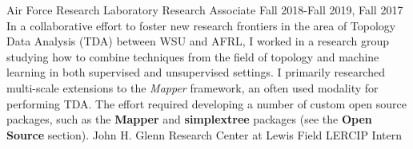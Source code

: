 \documentclass[11pt,a4paper,sans]{moderncv} %
\begin{document}
			 {Air Force Research Laboratory}
			 {Research Associate}
			 {Fall 2018-Fall 2019, Fall 2017}{}{\vspace{3pt}
			 In a collaborative effort to foster new research frontiers in the area of Topology Data Analysis (TDA) between WSU and AFRL, I worked in a research group studying how to combine techniques from  the field of topology and machine learning in both supervised and unsupervised settings. I primarily researched multi-scale extensions to the \textit{Mapper} framework, an often used modality for performing TDA. 
The effort required developing a number of custom open source packages, such as the \textbf{Mapper} and \textbf{simplextree} packages (see the \textbf{Open Source} section).  
}
\vspace{0.75em}
			 {John H. Glenn Research Center at Lewis Field}
			 {LERCIP Intern}
\end{document}
